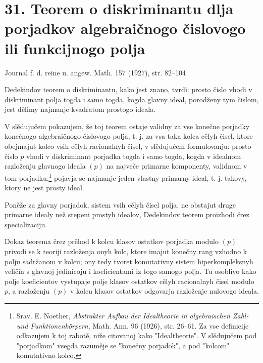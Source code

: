 \documentclass[11pt]{article}
\begin{document}

\section*{31. Teorem o diskriminantu dlja porjadkov algebraičnogo čislovogo ili funkcijnogo polja}
\begin{center}
Journal f. d. reine u. angew. Math. 157 (1927), str. 82--104
\end{center}

Dedekindov teorem o diskriminantu, kako jest znano, tvrdi: prosto čislo vhodi v diskriminant polja togda i samo togda, kogda glavny ideal, porodženy tym čislom, jest dělimy najmanje kvadratom prostogo ideala.

V slědujučem pokazujem, že toj teorem ostaje validny za vse konečne porjadky konečnogo algebraičnogo čislovogo polja, t. j. za vsa taka kolca cělyh čisel, ktore obejmajut kolco vsih cělyh racionalnyh čisel, v slědujućem formulovanju: prosto čislo $p$ vhodi v diskriminant porjadka togda i samo togda, kogda v idealnom razloženju glavnogo ideala $(p)$ na največe primarne komponenty, validnom v tom porjadku,\footnote{Srav. E. Noether, \emph{Abstrakter Aufbau der Idealtheorie in algebraischen Zahl- und Funktionenkörpern}, Math. Ann. 96 (1926), str. 26--61. Za vse definicije odkazujem k toj rabotě, niže citovanoj kako "Idealtheorie". V slědujučem pod "porjadkom" vsegda razuměje se "konečny porjadok", a pod "kolcom" komutativno kolco.} pojavja se najmanje jeden vlastny primarny ideal, t. j. takovy, ktory ne jest prosty ideal.

Poněže za glavny porjadok, sistem vsih cělyh čisel polja, ne obstajut druge primarne idealy než stepeni prostyh idealov, Dedekindov teorem proizhodi črez specializaciju.

Dokaz teorema črez prěhod k kolcu klasov ostatkov porjadka modulo $(p)$ privodi se k teoriji razloženja onyh kolc, ktore imajut konečny rang vzhodno k polju sadržanom v kolcu; ony tedy tvoret komutativny sistem hiperkompleksnyh veličin s glavnoj jedinicoju i koeficientami iz togo samogo polja. Tu osoblivo kako polje koeficientov vystupaje polje klasov ostatkov cělyh racionalnyh čisel modulo $p$, a razloženju $(p)$ v kolcu klasov ostatkov odgovarja razloženje nulovogo ideala.
\end{document}
